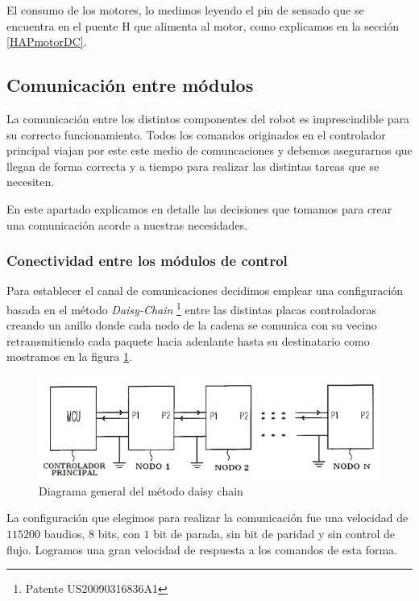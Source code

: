 	El consumo de los motores, lo medimos leyendo el pin de sensado que se encuentra en el puente H que alimenta al motor, como
	explicamos en la secci\'on \ref{HAPmotorDC}.

\subsection{Comunicaci\'on entre m\'odulos}
\label{Hcomm}

La comunicaci\'on entre los distintos componentes del robot es imprescindible para su correcto funcionamiento. Todos los comandos
originados en el controlador principal viajan por este este medio de comuncaciones y debemos asegurarnos que llegan de forma correcta
y a tiempo para realizar las distintas tareas que se necesiten.

En este apartado explicamos en detalle las decisiones que tomamos para crear una comunicaci\'on acorde a nuestras necesidades.

\subsubsection{Conectividad entre los m\'odulos de control}
\label{HCconectividad}

Para establecer el canal de comunicaciones decidimos emplear una configuraci\'on basada en el m\'etodo \emph{Daisy-Chain}
\footnote{Patente US20090316836A1} entre las distintas placas controladoras creando un anillo donde cada nodo de la cadena se
comunica con su vecino retransmitiendo cada paquete hacia adenlante hasta su destinatario como mostramos en la figura
\ref{daisychain_diagram}.

\begin{figure}[ht]
	\centering
	\includegraphics[scale=.40]{daisychain_diagram.png}
	\caption{Diagrama general del m\'etodo daisy chain}
	\label{daisychain_diagram}
\end{figure}

La configuraci\'on que elegimos para realizar la comunicaci\'on fue una velocidad de $115200$ baudios, $8$ bits, con $1$ bit de parada,
sin bit de paridad y sin control de flujo. Logramos una gran velocidad de respuesta a los comandos de esta forma.

